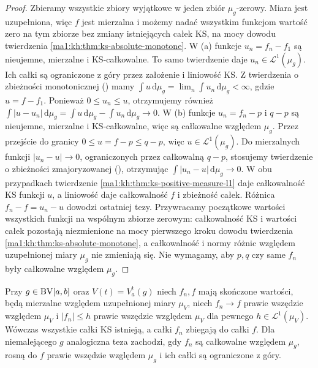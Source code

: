 \begin{proof}
Zbieramy wszystkie zbiory wyjątkowe w jeden zbiór $\mu_g$-zerowy. Miara jest uzupełniona, więc $f$ jest mierzalna i możemy nadać wszystkim funkcjom wartość zero na tym zbiorze bez zmiany istniejących całek KS, na mocy dowodu twierdzenia \ref{ma1:kh:thm:ks-absolute-monotone}. W (a) funkcje $u_n=f_n-f_1$ są nieujemne, mierzalne i KS-całkowalne. To samo twierdzenie daje $u_n\in\mathcal L^1(\mu_g)$. Ich całki są ograniczone z góry przez założenie i liniowość KS. Z twierdzenia o zbieżności monotonicznej
() mamy
$\int u\,\mathrm d\mu_g=\lim_n\int u_n\,\mathrm d\mu_g<\infty$,
gdzie $u=f-f_1$. Ponieważ $0\le u_n\le u$,
otrzymujemy również
$\int|u-u_n|\,\mathrm d\mu_g=\int u\,\mathrm d\mu_g-
\int u_n\,\mathrm d\mu_g\to0$. W (b) funkcje $u_n=f_n-p$ i $q-p$ są nieujemne, mierzalne i KS-całkowalne, więc są całkowalne względem $\mu_g$. Przez przejście do granicy $0\le u=f-p\le q-p$,
więc $u\in\mathcal L^1(\mu_g)$. Do mierzalnych funkcji
$|u_n-u|\to0$, ograniczonych przez całkowalną $q-p$,
stosujemy twierdzenie o zbieżności zmajoryzowanej
(), otrzymując
$\int|u_n-u|\,\mathrm d\mu_g\to0$. W obu przypadkach twierdzenie \ref{ma1:kh:thm:ks-positive-measure-l1} daje całkowalność KS funkcji $u$, a liniowość daje całkowalność $f$ i zbieżność całek. Różnica $f_n-f=u_n-u$ dowodzi ostatniej tezy. Przywracamy początkowe wartości wszystkich funkcji na wspólnym zbiorze zerowym: całkowalność KS i wartości całek pozostają niezmienione na mocy pierwszego kroku dowodu twierdzenia \ref{ma1:kh:thm:ks-absolute-monotone}, a całkowalność i normy różnic względem uzupełnionej miary $\mu_g$ nie zmieniają się. Nie wymagamy, aby $p,q$ czy same $f_n$ były całkowalne względem $\mu_g$.
\end{proof}
\begin{wniosek}\label{ma1:kh:cor:ks-measure-limits}
Przy $g\in\mathrm{BV}[a,b]$ oraz $V(t)=V_a^t(g)$ niech $f_n,f$ mają skończone wartości, będą mierzalne względem uzupełnionej miary $\mu_V$, niech $f_n\to f$ prawie wszędzie względem $\mu_V$ i $|f_n|\le h$ prawie wszędzie względem $\mu_V$ dla pewnego $h\in\mathcal L^1(\mu_V)$. Wówczas wszystkie całki KS istnieją, a całki $f_n$ zbiegają do całki $f$. Dla niemalejącego $g$ analogiczna teza zachodzi, gdy $f_n$ są całkowalne względem $\mu_g$, rosną do $f$ prawie wszędzie względem $\mu_g$ i ich całki są ograniczone z góry.
\end{wniosek}
